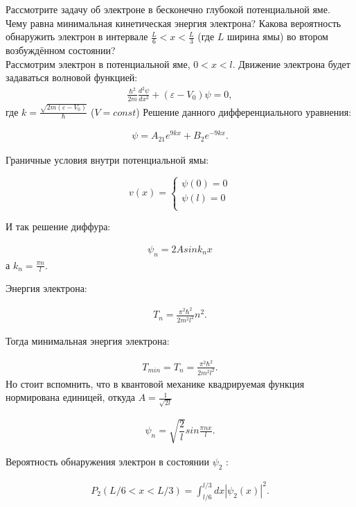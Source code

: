 \documentclass[__main__.tex]{subfiles}
\begin{document}
Рассмотрите задачу об электроне в бесконечно глубокой потенциальной яме. Чему равна минимальная кинетическая энергия электрона? Какова вероятность обнаружить электрон в интервале $\frac{L}{6}<x<\frac{L}{3}$ (где $L$ ширина ямы) во втором возбуждённом состоянии?\\ 


Рассмотрим электрон в потенциальной яме, $0<x<l$.
Движение электрона будет задаваться волновой функцией:
\begin{gather}
 \frac{\hbar^{2}}{2m}\frac{d^{2}\psi}{dx^{2}}+(\varepsilon-V_{0})\psi=0,
\end{gather}
где $k=\frac{\sqrt{2m(\varepsilon-V_{0})}}{\hbar}$ ($V=const$)
Решение данного дифференциального уравнения:

\begin{gather}
\psi=A_{21}e^{9kx}+B_{2}e^{-9kx}.
\end{gather}

Граничные условия внутри потенциальной ямы:

$$
v(x)=
\left\{
\begin{gathered}
\psi(0)=0\\
\psi(l)=0\\
\end{gathered}
\right.
$$

И так решение диффура: 

\begin{gather}
\psi_{n}=2A sin{k_{n}x}
\end{gather}
а $k_{n}=\frac{\pi n}{l}.$

Энергия электрона:

\begin{gather}
T_{n}=\frac{\pi^{2}\hbar^{2}}{2m^{2}l^{2}}{}n^{2}.
\end{gather}

Тогда минимальная энергия электрона:

\begin{gather}
T_{min}=T_{n}=\frac{\pi^{2}\hbar^{2}}{2m^{2}l^{2}}.
\end{gather}
Но стоит вспомнить, что в квантовой механике квадрируемая функция нормирована единицей, откуда $A=\frac{1}{\sqrt{2l}}$

\begin{gather}
\psi_{n}=\sqrt{\dfrac{2}{l}} sin{\frac{\pi n x}{l}}.
\end{gather}

Вероятность обнаружения электрон в состоянии $\psi_{2}$ :

\begin{gather}
P_{2}(L/6<x<L/3)=\int_{l/6}^{l/3}dx|\psi_{2}(x)|^{2}.
\end{gather}
\end{document}
